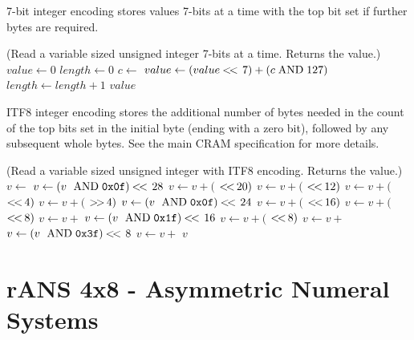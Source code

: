 \documentclass[a4paper]{article}
\begin{document}
7-bit integer encoding stores values 7-bits at a time with the top bit
set if further bytes are required.

\begin{algorithmic}[1]
\Statex
\Statex (Read a variable sized unsigned integer 7-bits at a time.  Returns the value.)
 
  \State $value \gets 0$
  \State $length \gets 0$
  \Repeat
    \State $c \gets$ 
    \State $value \gets (value \shiftl 7) + (c \bitand 127)$
    \State $length \gets length + 1$
  \State \Return $value$
  \EndFunction
\end{algorithmic}

ITF8 integer encoding stores the additional number of bytes needed in
the count of the top bits set in the initial byte (ending with a zero
bit), followed by any subsequent whole bytes.  See the main CRAM
specification for more details.

\begin{algorithmic}[1]
\Statex
\Statex (Read a variable sized unsigned integer with ITF8 encoding.  Returns the value.)
 
  \State $v \gets$ 
    \State $v \gets (v\ \bitand \mathtt{0x0f}) \shiftl 28$
    \State $v \gets v + ($  $\mathbin{<\mkern-3mu<\,} 20)$
    \State $v \gets v + ($  $\mathbin{<\mkern-3mu<\,} 12)$
    \State $v \gets v + ($  $\mathbin{<\mkern-3mu<\,}  4)$
    \State $v \gets v + ($  $\mathbin{>\mkern-3mu>\,}  4)$
    \State $v \gets (v\ \bitand \mathtt{0x0f}) \shiftl 24$
    \State $v \gets v + ($  $\mathbin{<\mkern-3mu<\,} 16)$
    \State $v \gets v + ($  $\mathbin{<\mkern-3mu<\,} 8)$
    \State $v \gets v + $ 
    \State $v \gets (v\ \bitand \mathtt{0x1f}) \shiftl 16$
    \State $v \gets v + ($  $\mathbin{<\mkern-3mu<\,} 8)$
    \State $v \gets v + $ 
    \State $v \gets (v\ \bitand \mathtt{0x3f}) \shiftl 8$
    \State $v \gets v + $ 
  \EndIf
  \State \Return $v$
  \EndFunction
\end{algorithmic}

\section{rANS 4x8 - Asymmetric Numeral Systems}
\end{document}
